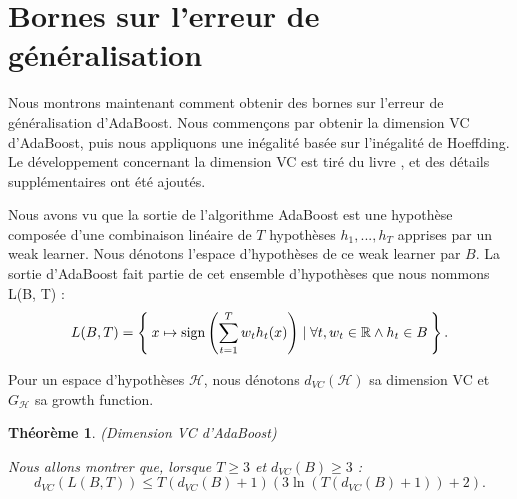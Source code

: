 \documentclass[12pt]{article}
\newcommand{\R}{\mathbb{R}}
\newtheorem{theorem}{Théorème}
\begin{document}
	\section{Bornes sur l’erreur de généralisation}
	
	Nous montrons maintenant comment obtenir des bornes sur l'erreur de généralisation d'AdaBoost.
	Nous commençons par obtenir la dimension VC d'AdaBoost, puis nous appliquons une inégalité basée sur l'inégalité de Hoeffding.
	Le développement concernant la dimension VC est tiré du livre \cite{Shalev-Shwartz2014-ba}, et des détails supplémentaires ont été ajoutés.
	
	Nous avons vu que la sortie de l'algorithme AdaBoost est une hypothèse composée d'une combinaison linéaire de $T$ hypothèses $h_1, ..., h_T$ apprises par un weak learner.
	Nous dénotons l'espace d'hypothèses de ce weak learner par $B$.
	La sortie d'AdaBoost fait partie de cet ensemble d'hypothèses que nous nommons L(B, T) :
	\[
	L(B, T) = \Set{ x \mapsto \text{sign}\left( \sum_{t=1}^T w_t h_t(x) \right) \mid \forall t, w_t \in \R \land h_t \in B}.
	\]
	
	Pour un espace d'hypothèses $\mathcal{H}$, nous dénotons $d_{VC}(\mathcal{H})$ sa dimension VC et $G_{\mathcal{H}}$ sa growth function.
	
	\begin{theorem}{(Dimension VC d'AdaBoost)}
		
		Nous allons montrer que, lorsque $T \geq 3$ et $d_{VC}(B) \geq 3$ :
		\[
		d_{VC}(L(B, T)) \leq T(d_{VC}(B) + 1) (3 \ln(T (d_{VC}(B) + 1)) + 2).
		\]
	\end{theorem}
\end{document}
